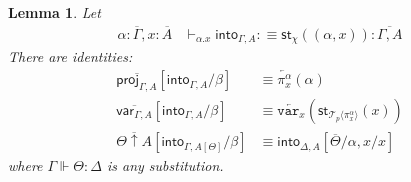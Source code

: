 \documentclass[10pt]{article}
\newtheorem{lemma}{Lemma}
\theoremstyle{definition}
\newcommand{\yields}{\vdash}
\newcommand{\rewrite}[2]{\overleftarrow{#1}(#2)}
\newcommand\StI[2]{\ensuremath{\mathsf{st}_{#1}(#2)}}
\newcommand\ApEl[2]{\mathcal{T}_{#1}\langle#2\rangle}
\newcommand{\qyields}{\Vdash}
\newcommand{\upstairs}[1]{\overline{#1}}
\newcommand\proj[1]{\ensuremath{\mathsf{proj}_{#1}}}
\newcommand\qvar[1]{\ensuremath{\mathsf{var}_{#1}}}
\newcommand\into[1]{\ensuremath{\mathsf{into}_{#1}}}
\newcommand\var[1]{\ensuremath{\mathtt{var}_{#1}}}
\begin{document}
\begin{lemma}\label{lem:into-identities}
Let 
\begin{align*}
\alpha : \upstairs{\Gamma}, x : \upstairs{A} &\yields_{\alpha.x} \into{\Gamma, A} :\equiv \StI{\chi}{(\alpha, x)} : \upstairs{\Gamma, A}
\end{align*}
There are identities:
\begin{align*}
\upstairs{\proj{\Gamma, A}}[\into{\Gamma, A}/\beta] &\equiv \rewrite{\pi^\alpha_x}{\alpha} \\
\upstairs{\qvar{\Gamma, A}}[\into{\Gamma, A}/\beta] &\equiv \rewrite{\var{x}}{\StI{\ApEl{p}{\pi^{\alpha}_x}}{x}} \\
\upstairs{\Theta \uparrow A}[\into{\Gamma, A[\Theta]}/\beta] &\equiv \into{\Delta, A}[\upstairs{\Theta}/\alpha, x / x]
\end{align*}
where $\Gamma \qyields \Theta : \Delta$ is any substitution.
\end{lemma}
\end{document}
